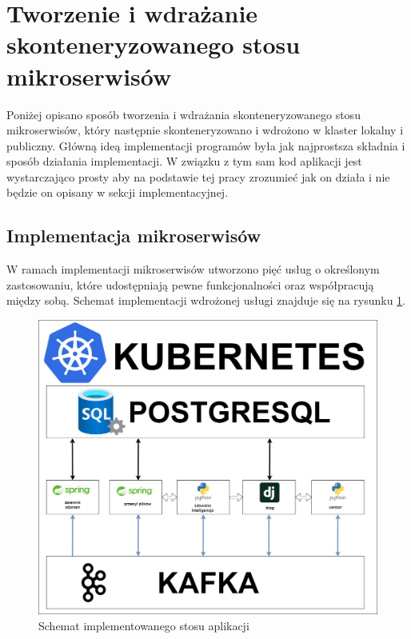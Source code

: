 \documentclass[12pt,twoside]{article}
\begin{document}
\section{Tworzenie i wdrażanie skonteneryzowanego stosu mikroserwisów }

Poniżej opisano sposób tworzenia i wdrażania skonteneryzowanego stosu mikroserwisów, który następnie skonteneryzowano i wdrożono w klaster lokalny i publiczny. Główną ideą implementacji programów była jak najprostsza składnia i sposób działania implementacji. W związku z tym sam kod aplikacji jest wystarczająco prosty aby na podstawie tej pracy zrozumieć jak on działa i nie będzie on opisany w sekcji implementacyjnej.
\subsection{Implementacja mikroserwisów}

W ramach implementacji mikroserwisów utworzono pięć usług o określonym zastosowaniu, które udostępniają pewne funkcjonalności oraz współpracują między sobą. Schemat implementacji wdrożonej usługi znajduje się na rysunku \ref{Fig:schemat}.
\begin{figure}[ht]
	\centering
	\includegraphics[width=16cm]{figures/diagram.jpg}
	\caption{Schemat implementowanego stosu aplikacji}
\label{Fig:schemat}
\end{figure}
\end{document}
